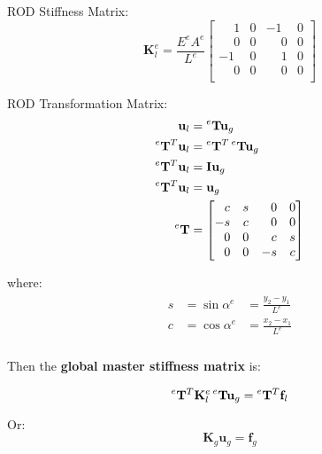 \documentclass[10pt,b5paper,titlepage]{book}
\newcommand{\m}{\mathbf}
\newenvironment{eqarray}
{
    \begin{eqnarray}
        \begin{aligned}
}
{
        \end{aligned}
    \end{eqnarray}
}
\begin{document}
ROD Stiffness Matrix:
\begin{equation}
    \m{K}_l^e = \frac{E^e A^e}{L^e} \begin{bmatrix}
        \phantom{-}1 & 0 & -1 & 0 \\
        \phantom{-}0 & 0 & \phantom{-}0 & 0 \\
        -1 & 0 & \phantom{-}1 & 0 \\
        \phantom{-}0 & 0 & \phantom{-}0 & 0 \\
    \end{bmatrix}
\end{equation}

ROD Transformation Matrix:
\begin{eqarray}
    \m{u}_l &= \prescript{e}{}{\m{T}} \m{u}_g \\
    \prescript{e}{}{\m{T}}^T \m{u}_l &=
        \prescript{e}{}{\m{T}}^T \prescript{e}{}{\m{T}} \m{u}_g \\
    \prescript{e}{}{\m{T}}^T \m{u}_l &= \m{I} \m{u}_g \\
    \prescript{e}{}{\m{T}}^T \m{u}_l &= \m{u}_g \\
    \prescript{e}{}{\m{T}} &=
    \begin{bmatrix}
        \phantom{-}c & s & \phantom{-}0 & 0 \\
        -s & c & \phantom{-}0 & 0 \\
        \phantom{-}0 & 0 & \phantom{-}c & s \\
        \phantom{-}0 & 0 & -s & c \\
    \end{bmatrix} \\
\end{eqarray}

where:
\begin{eqarray}
    s &= \sin \alpha^e &= \frac{y_2 - y_1}{L^e} \\
    c &= \cos \alpha^e &= \frac{x_2 - x_1}{L^e} \\
\end{eqarray}

Then the \textbf{global master stiffness matrix} is:

\begin{equation}
    \prescript{e}{}{\m{T}}^T \m{K}_l^e \prescript{e}{}{\m{T}} \m{u}_g
    = \prescript{e}{}{\m{T}}^T \m{f}_l
\end{equation}

Or:
\begin{equation}
    \m{K}_g \m{u}_g = \m{f}_g
\end{equation}
\end{document}
